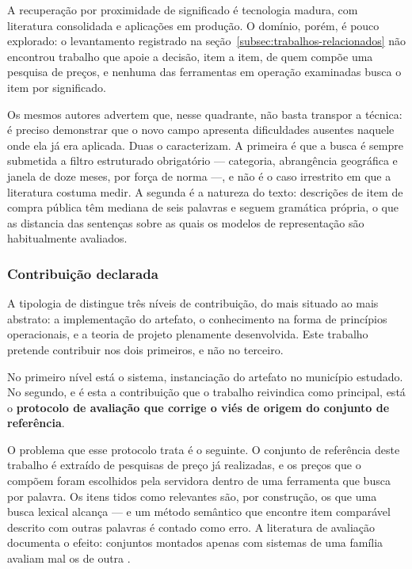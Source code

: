 A recuperação por proximidade de significado é tecnologia madura, com literatura
consolidada e aplicações em produção. O domínio, porém, é pouco explorado: o
levantamento registrado na seção~\ref{subsec:trabalhos-relacionados} não
encontrou trabalho que apoie a decisão, item a item, de quem compõe uma pesquisa
de preços, e nenhuma das ferramentas em operação examinadas busca o item por
significado.

Os mesmos autores advertem que, nesse quadrante, não basta transpor a técnica:
é preciso demonstrar que o novo campo apresenta dificuldades ausentes naquele
onde ela já era aplicada. Duas o caracterizam. A primeira é que a busca é sempre
submetida a filtro estruturado obrigatório --- categoria, abrangência geográfica
e janela de doze meses, por força de norma ---, e não é o caso irrestrito em que
a literatura costuma medir. A segunda é a natureza do texto: descrições de item
de compra pública têm mediana de seis palavras e seguem gramática própria, o que
as distancia das sentenças sobre as quais os modelos de representação são
habitualmente avaliados.

\subsubsection{Contribuição declarada}
\label{subsec:contribuicao}

A tipologia de  distingue três níveis de
contribuição, do mais situado ao mais abstrato: a implementação do artefato, o
conhecimento na forma de princípios operacionais, e a teoria de projeto
plenamente desenvolvida. Este trabalho pretende contribuir nos dois primeiros, e
não no terceiro.

No primeiro nível está o sistema, instanciação do artefato no município
estudado. No segundo, e é esta a contribuição que o trabalho reivindica como
principal, está o \textbf{protocolo de avaliação que corrige o viés de origem do
conjunto de referência}.

O problema que esse protocolo trata é o seguinte. O conjunto de referência deste
trabalho é extraído de pesquisas de preço já realizadas, e os preços que o
compõem foram escolhidos pela servidora dentro de uma ferramenta que busca por
palavra. Os itens tidos como relevantes são, por construção, os que uma busca
lexical alcança --- e um método semântico que encontre item comparável descrito
com outras palavras é contado como erro. A literatura de avaliação documenta o
efeito: conjuntos montados apenas com sistemas de uma família avaliam mal os de
outra .

